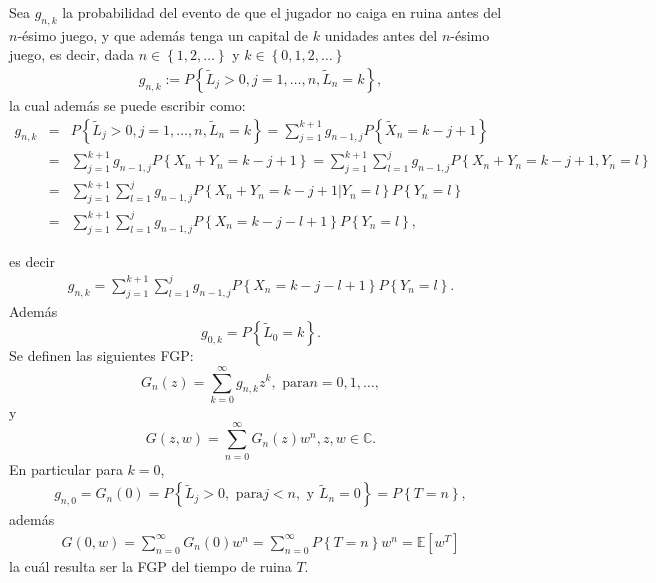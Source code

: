 \documentclass{article}
\newcommand{\esp}{\mathbb{E}}
\begin{document}
Sea $g_{n,k}$ la probabilidad del evento de que el jugador no caiga en ruina antes del $n$-\'esimo juego, y que adem\'as tenga un capital de $k$ unidades antes del $n$-\'esimo juego, es decir, dada $n\in\left\{1,2,\ldots\right\}$ y $k\in\left\{0,1,2,\ldots\right\}$
\begin{eqnarray}
g_{n,k}:=P\left\{\tilde{L}_{j}>0, j=1,\ldots,n,
\tilde{L}_{n}=k\right\},
\end{eqnarray}
la cual adem\'as se puede escribir como:
\begin{eqnarray*}
g_{n,k}&=&P\left\{\tilde{L}_{j}>0, j=1,\ldots,n,
\tilde{L}_{n}=k\right\}=\sum_{j=1}^{k+1}g_{n-1,j}P\left\{\tilde{X}_{n}=k-j+1\right\}\\
&=&\sum_{j=1}^{k+1}g_{n-1,j}P\left\{X_{n}+Y_{n}=k-j+1\right\}=\sum_{j=1}^{k+1}\sum_{l=1}^{j}g_{n-1,j}P\left\{X_{n}+Y_{n}=k-j+1,Y_{n}=l\right\}\\
&=&\sum_{j=1}^{k+1}\sum_{l=1}^{j}g_{n-1,j}P\left\{X_{n}+Y_{n}=k-j+1|Y_{n}=l\right\}P\left\{Y_{n}=l\right\}\\
&=&\sum_{j=1}^{k+1}\sum_{l=1}^{j}g_{n-1,j}P\left\{X_{n}=k-j-l+1\right\}P\left\{Y_{n}=l\right\},
\end{eqnarray*}

es decir
\begin{eqnarray}\label{Eq.Gnk.2S}
g_{n,k}=\sum_{j=1}^{k+1}\sum_{l=1}^{j}g_{n-1,j}P\left\{X_{n}=k-j-l+1\right\}P\left\{Y_{n}=l\right\}.
\end{eqnarray}
Adem\'as
\begin{equation}\label{Eq.L02S}
g_{0,k}=P\left\{\tilde{L}_{0}=k\right\}.
\end{equation}
Se definen las siguientes FGP:
\begin{equation}\label{Eq.3.16.a.2S}
G_{n}\left(z\right)=\sum_{k=0}^{\infty}g_{n,k}z^{k},\textrm{ para
}n=0,1,\ldots,
\end{equation}
y 
\begin{equation}\label{Eq.3.16.b.2S}
G\left(z,w\right)=\sum_{n=0}^{\infty}G_{n}\left(z\right)w^{n}, z,w\in\mathbb{C}.
\end{equation}
En particular para $k=0$,
\begin{eqnarray*}
g_{n,0}=G_{n}\left(0\right)=P\left\{\tilde{L}_{j}>0,\textrm{ para
}j<n,\textrm{ y }\tilde{L}_{n}=0\right\}=P\left\{T=n\right\},
\end{eqnarray*}
adem\'as
\begin{eqnarray*}%
G\left(0,w\right)=\sum_{n=0}^{\infty}G_{n}\left(0\right)w^{n}=\sum_{n=0}^{\infty}P\left\{T=n\right\}w^{n}
=\esp\left[w^{T}\right]
\end{eqnarray*}
la cu\'al resulta ser la FGP del tiempo de ruina $T$.
\end{document}
